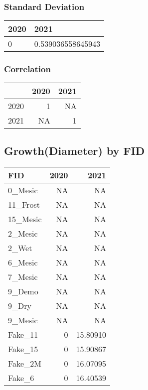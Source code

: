 \documentclass[
]{article}
\begin{document}
\hypertarget{standard-deviation}{%
\subsubsection{Standard Deviation}\label{standard-deviation}}

\begin{table}[H]
\centering
\begin{tabular}{l|l}
\hline
2020 & 2021\\
\hline
0 & 0.539036558645943\\
\hline
\end{tabular}
\end{table}

\hypertarget{correlation}{%
\subsubsection{Correlation}\label{correlation}}

\begin{table}[H]
\centering
\begin{tabular}{l|r|r}
\hline
  & 2020 & 2021\\
\hline
2020 & 1 & NA\\
\hline
2021 & NA & 1\\
\hline
\end{tabular}
\end{table}

\hypertarget{growthdiameter-by-fid}{%
\subsection{Growth(Diameter) by FID}\label{growthdiameter-by-fid}}

\begin{table}[H]
\centering
\begin{tabular}{l|r|r}
\hline
FID & 2020 & 2021\\
\hline
0\_Mesic & NA & NA\\
\hline
11\_Frost & NA & NA\\
\hline
15\_Mesic & NA & NA\\
\hline
2\_Mesic & NA & NA\\
\hline
2\_Wet & NA & NA\\
\hline
6\_Mesic & NA & NA\\
\hline
7\_Mesic & NA & NA\\
\hline
9\_Demo & NA & NA\\
\hline
9\_Dry & NA & NA\\
\hline
9\_Mesic & NA & NA\\
\hline
Fake\_11 & 0 & 15.80910\\
\hline
Fake\_15 & 0 & 15.90867\\
\hline
Fake\_2M & 0 & 16.07095\\
\hline
Fake\_6 & 0 & 16.40539\\
\hline
\end{tabular}
\end{table}
\end{document}
